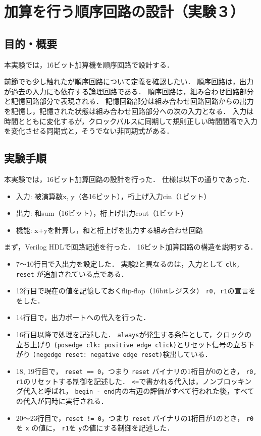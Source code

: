 \documentclass[uplatex]{jsarticle}
\begin{document}
\clearpage

\section{加算を行う順序回路の設計（実験３）}

\subsection{目的・概要}

本実験では，16ビット加算機を順序回路で設計する．

前節でも少し触れたが順序回路について定義を確認したい．
順序回路は，出力が過去の入力にも依存する論理回路である．
順序回路は，組み合わせ回路部分と記憶回路部分で表現される．
記憶回路部分は組み合わせ回路回路からの出力を記憶し，記憶された状態は組み合わせ回路部分への次の入力となる．
入力は時間とともに変化するが，クロックパルスに同期して規則正しい時間間隔で入力を変化させる同期式と，そうでない非同期式がある．



\subsection{実験手順}

本実験では，16ビット加算回路の設計を行った．
仕様は以下の通りであった．

\begin{itemize}
  \item 入力: 被演算数x, y（各16ビット），桁上げ入力cin（1ビット）
  \item 出力: 和sum（16ビット），桁上げ出力cout（1ビット）
  \item 機能: x+yを計算し，和と桁上げを出力する組み合わせ回路
\end{itemize}

まず，Verilog HDLで回路記述を行った．
16ビット加算回路の構造を説明する．

\begin{itemize}
  \item 
    7〜10行目で入出力を設定した．
    実験2と異なるのは，入力として {\tt clk, reset} が追加されている点である．
  \item 
    12行目で現在の値を記憶しておくflip-flop（16bitレジスタ） {\tt r0, r1}の宣言ををした．
  \item 14行目で，出力ポートへの代入を行った．
  \item 
    16行目以降で処理を記述した．
    {\tt always}が発生する条件として，クロックの立ち上げり {\tt (posedge clk: positive edge click)}とリセット信号の立ち下がり {\tt (negedge reset: negative edge reset)}検出している．
  \item 
    18, 19行目で， {\tt reset == 0}，つまり {\tt reset} バイナリの1桁目が0のとき， {\tt r0, r1}のリセットする制御を記述した．
    {\tt <=}で書かれる代入は，ノンブロッキング代入と呼ばれ， {\tt begin - end}内の右辺の評価がすべて行われた後，すべての代入が同時に実行される．
  \item
    20〜23行目で，{\tt reset != 0}，つまり {\tt reset} バイナリの1桁目が1のとき， {\tt r0}を {\tt x} の値に， {\tt r1}を {\tt y}の値にする制御を記述した．
\end{itemize}
\end{document}
